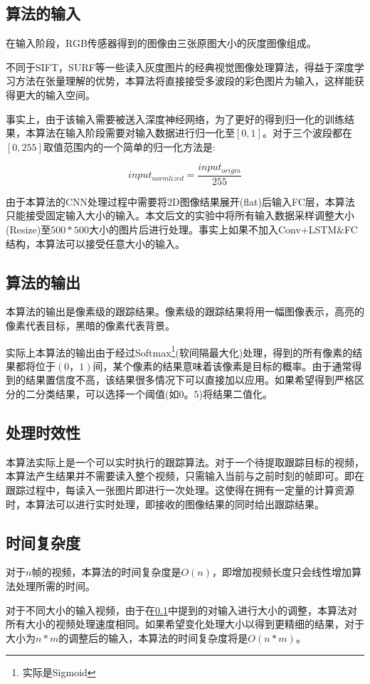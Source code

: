 \subsection{算法的输入} \label{section:input_of_our_algorithm}
\par
在输入阶段，RGB传感器得到的图像由三张原图大小的灰度图像组成。
\par
不同于SIFT\supercite{lowe1999object}，SURF\supercite{bay2006surf}等一些读入灰度图片的经典视觉图像处理算法，得益于深度学习方法在张量理解的优势，本算法将直接接受多波段的彩色图片为输入，这样能获得更大的输入空间。
\par
事实上，由于该输入需要被送入深度神经网络，为了更好的得到归一化的训练结果，本算法在输入阶段需要对输入数据进行归一化至$[0,1]$。对于三个波段都在$[0,255]$取值范围内的一个简单的归一化方法是:
\par
\begin{equation}\label{equ:input_norm}  input_{normlized} = \frac{input_{origin}}{255}  \end{equation}
\par
由于本算法的CNN处理过程中需要将2D图像结果展开(flat)后输入FC层，本算法只能接受固定输入大小的输入。本文后文的实验中将所有输入数据采样调整大小(Resize)至$500*500$大小的图片后进行处理。事实上如果不加入Conv+LSTM\&FC结构，本算法可以接受任意大小的输入。
\par

\subsection{算法的输出}
本算法的输出是像素级的跟踪结果。像素级的跟踪结果将用一幅图像表示，高亮的像素代表目标，黑暗的像素代表背景。
\par
实际上本算法的输出由于经过Softmax\footnote{实际是Sigmoid}(软间隔最大化)处理，得到的所有像素的结果都将位于$(0，1)$间，某个像素的结果意味着该像素是目标的概率。由于通常得到的结果置信度不高，该结果很多情况下可以直接加以应用。如果希望得到严格区分的二分类结果，可以选择一个阈值(如$0。5$)将结果二值化。

\subsection{处理时效性}
本算法实际上是一个可以实时执行的跟踪算法。对于一个待提取跟踪目标的视频，本算法产生结果并不需要读入整个视频，只需输入当前与之前时刻的帧即可。即在跟踪过程中，每读入一张图片即进行一次处理。这使得在拥有一定量的计算资源时，本算法可以进行实时处理，即接收的图像结果的同时给出跟踪结果。

\subsection{时间复杂度}
对于$n$帧的视频，本算法的时间复杂度是$O(n)$，即增加视频长度只会线性增加算法处理所需的时间。
\par
对于不同大小的输入视频，由于在\ref{section:input_of_our_algorithm}中提到的对输入进行大小的调整，本算法对所有大小的视频处理速度相同。如果希望变化处理大小以得到更精细的结果，对于大小为$n*m$的调整后的输入，本算法的时间复杂度将是$O(n*m)$。


